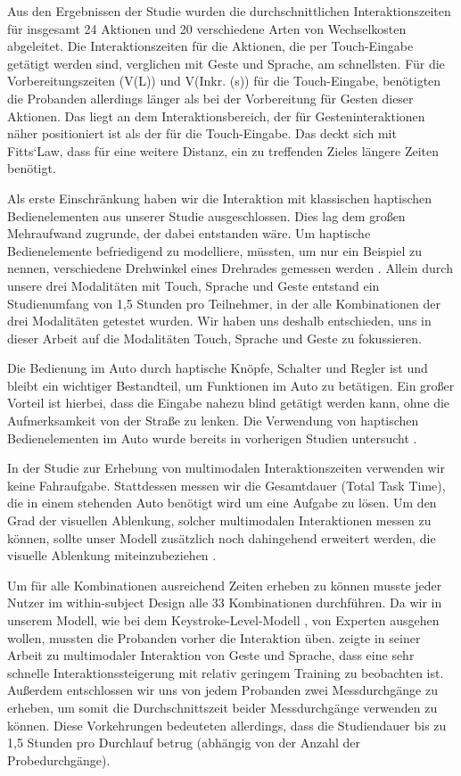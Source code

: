 Aus den Ergebnissen der Studie wurden die durchschnittlichen Interaktionszeiten für insgesamt 24 Aktionen und 20 verschiedene Arten von Wechselkosten abgeleitet. 
Die Interaktionszeiten für die Aktionen, die per Touch-Eingabe getätigt werden sind, verglichen mit Geste und Sprache, am schnellsten. 
Für die Vorbereitungszeiten (V(L)) und V(Inkr. (s)) für die Touch-Eingabe, benötigten die Probanden allerdings länger als bei der Vorbereitung für Gesten dieser Aktionen.
Das liegt an dem Interaktionsbereich, der für Gesteninteraktionen näher positioniert ist als der für die Touch-Eingabe. 
Das deckt sich mit Fitts`Law, dass für eine weitere Distanz, ein zu treffenden Zieles längere Zeiten benötigt. 

Als erste Einschränkung haben wir die Interaktion mit klassischen haptischen Bedienelementen aus unserer Studie ausgeschlossen.
Dies lag dem großen Mehraufwand zugrunde, der dabei entstanden wäre.
Um haptische Bedienelemente befriedigend zu modelliere, müssten, um nur ein Beispiel zu nennen, verschiedene Drehwinkel eines Drehrades gemessen werden \citep{schneegass_2009}.
Allein durch unsere drei Modalitäten mit Touch, Sprache und Geste entstand ein Studienumfang von 1,5 Stunden pro Teilnehmer, in der alle Kombinationen der drei Modalitäten getestet wurden.
Wir haben uns deshalb entschieden, uns in dieser Arbeit auf die Modalitäten Touch, Sprache und Geste zu fokussieren.

Die Bedienung im Auto durch haptische Knöpfe, Schalter und Regler ist und bleibt ein wichtiger Bestandteil, um Funktionen im Auto zu betätigen.
Ein großer Vorteil ist hierbei, dass die Eingabe nahezu blind getätigt werden kann, ohne die Aufmerksamkeit von der Straße zu lenken.
Die Verwendung von haptischen Bedienelementen im Auto wurde bereits in vorherigen Studien untersucht \citep{Pettitt_2007,schneegass_2009,SchneegaB_2011}.

In der Studie zur Erhebung von multimodalen Interaktionszeiten verwenden wir keine Fahraufgabe.
Stattdessen messen wir die Gesamtdauer (Total Task Time), die in einem stehenden Auto benötigt wird um eine Aufgabe zu lösen.
Um den Grad der visuellen Ablenkung, solcher multimodalen Interaktionen messen zu können, sollte unser Modell zusätzlich noch dahingehend erweitert werden, die visuelle Ablenkung miteinzubeziehen \citep{Pettitt_2007}.
 
Um für alle Kombinationen ausreichend Zeiten erheben zu können musste jeder Nutzer im within-subject Design alle 33 Kombinationen durchführen.
Da wir in unserem Modell, wie bei dem Keystroke-Level-Modell \citep{Card_1980}, von Experten ausgehen wollen, mussten die Probanden vorher die Interaktion üben.
\citet{Jude:2014} zeigte in seiner Arbeit zu multimodaler Interaktion von Geste und Sprache, dass eine sehr schnelle Interaktionssteigerung mit relativ geringem Training zu beobachten ist.
Außerdem entschlossen wir uns von jedem Probanden zwei Messdurchgänge zu erheben, um somit die Durchschnittszeit beider Messdurchgänge verwenden zu können.
Diese Vorkehrungen bedeuteten allerdings, dass die Studiendauer bis zu 1,5 Stunden pro Durchlauf betrug (abhängig von der Anzahl der Probedurchgänge).

